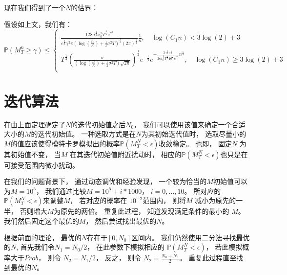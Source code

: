  现在我们得到了一个$N$的估界：
 \begin{theorem}
 假设如上文，我们有：
 \begin{equation}
 \mathbb{P}(M_T^n\geq \gamma)\leq 
 \begin{cases}
 \frac{128\sigma^{\frac{1}{2}}x_0^2T^{\frac{5}{4}}e^{\sigma^2}}{e^{\frac{1}{4}}\gamma^2\pi (\log(\frac{x_0}{K})+\frac{1}{2}\sigma^2T)^{\frac{1}{2}}(2\pi)^{\frac{1}{4}}}\frac{1}{n}, \quad \log(C_1n)<3\log(2)+3\\
 T^{\frac{1}{4}}(\frac{\sigma}{(\log(\frac{x_0}{K})+\frac{1}{2}\sigma^2T)\sqrt{2\pi}})^{\frac{1}{2}}e^{-\frac{1}{4}}e^{-\frac{3\gamma^{\frac{2}{3}}\pi^{\frac{1}{3}}}{2ex_0^{\frac{2}{3}}T^{\frac{1}{3}}16^{\frac{1}{3}}e^{\frac{\sigma^2}{3}}}n^{\frac{1}{3}}}, \quad \log(C_1n)\geq 3\log(2)+3\\
 \end{cases}
 \end{equation}
\end{theorem}


\section{迭代算法} %
\label{sec:M}
在由上面定理确定了$N$的迭代初始值之后$N_0$， 我们可以使用该值来确定一个合适大小的$M$的迭代初始值。
一种选取方式是在$N$为其初始迭代值时， 选取尽量小的$M$的值应该使得模特卡罗模拟出的概率$\mathbb{P}(M_T^N<\epsilon)$收敛稳定。
也即， 固定$N$ 为其初始值不变， 当$M$ 在其迭代初始值附近扰动时， 相应的$\mathbb{P}(M_T^N<\epsilon)$也只是在可接受范围内微小扰动。

在我们的问题背景下， 通过动态调优和经验发现， 一个较为恰当的$M$初始值可以为$M=10^5$， 我们通过比较$M=10^5+i*1000$， $i=0,...,10$。 
所对应的$\mathbb{P}(M_T^N<\epsilon)$来调整$M$， 若对应的概率在 $10^{-2}$范围内， 则将$M$ 减小为原先的一半， 否则增大$M$为原先的两倍。
重复此过程， 知道发现满足条件的最小的 $M$。 我们然后固定这个最优的$M$， 然后尝试找出最优的$N$。

根据前面的理论， 最优的$N$存在于$[0, N_0]$区间内。 我们仍然使用二分法寻找最优的$N$, 首先我们令$N_1=N_0/2$， 在此参数下模拟相应的
$\mathbb{P}(M_T^N<\epsilon)$， 若此模拟概率大于$Prob$， 则令 $N_2=N_1/2$， 反之， 则令 $N_2=\frac{N_0+N_1}{2}$。
重复此过程直至找到最优的$N$。





